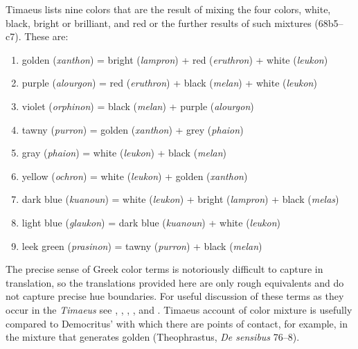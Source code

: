 Timaeus lists nine colors that are the result of mixing the four colors, white, black, bright or brilliant, and red or the further results of such mixtures (68b5--c7). These are:
\begin{enumerate}
	\item golden (\emph{xanthon}) = bright (\emph{lampron}) + red (\emph{eruthron}) + white (\emph{leukon})
	\item purple (\emph{alourgon}) = red (\emph{eruthron}) + black (\emph{melan}) + white (\emph{leukon})
	\item violet (\emph{orphinon}) = black (\emph{melan}) + purple (\emph{alourgon})
	\item tawny (\emph{purron}) = golden (\emph{xanthon}) + grey (\emph{phaion})
	\item gray (\emph{phaion}) = white (\emph{leukon}) + black (\emph{melan})
	\item yellow (\emph{ochron}) = white (\emph{leukon}) + golden (\emph{xanthon})
	\item dark blue (\emph{kuanoun}) = white (\emph{leukon}) + bright (\emph{lampron}) + black (\emph{melas})
	\item light blue (\emph{glaukon}) = dark blue (\emph{kuanoun}) + white (\emph{leukon})
	\item leek green (\emph{prasinon}) = tawny (\emph{purron}) + black (\emph{melan})
\end{enumerate}
The precise sense of Greek color terms is notoriously difficult to capture in translation, so the translations provided here are only rough equivalents and do not capture precise hue boundaries. For useful discussion of these terms as they occur in the \emph{Timaeus} see \citet{Platnauer:1921bh}, \citet[483--5]{Taylor:1928qb}, \citet[chapter 10]{Bruno:1977fk}, \citet{Levides:2002aa}, and \citet{Struycken:2003zr}. Timaeus account of color mixture is usefully compared to Democritus' with which there are points of contact, for example, in the mixture that generates golden (Theophrastus, \emph{De sensibus} 76--8).

